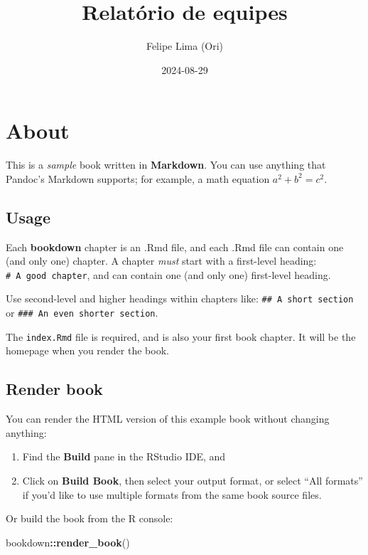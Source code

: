 \documentclass[
]{book}
\title{Relatório de equipes}
\author{Felipe Lima (Ori)}
\date{2024-08-29}
\newenvironment{Shaded}{\begin{snugshade}}{\end{snugshade}}
\newcommand{\FunctionTok}[1]{\textcolor[rgb]{0.13,0.29,0.53}{\textbf{#1}}}
\newcommand{\NormalTok}[1]{#1}
\newcommand{\SpecialCharTok}[1]{\textcolor[rgb]{0.81,0.36,0.00}{\textbf{#1}}}
\begin{document}
\maketitle

{
\setcounter{tocdepth}{1}
\tableofcontents
}
\chapter{About}\label{about}

This is a \emph{sample} book written in \textbf{Markdown}. You can use anything that Pandoc's Markdown supports; for example, a math equation \(a^2 + b^2 = c^2\).

\section{Usage}\label{usage}

Each \textbf{bookdown} chapter is an .Rmd file, and each .Rmd file can contain one (and only one) chapter. A chapter \emph{must} start with a first-level heading: \texttt{\#\ A\ good\ chapter}, and can contain one (and only one) first-level heading.

Use second-level and higher headings within chapters like: \texttt{\#\#\ A\ short\ section} or \texttt{\#\#\#\ An\ even\ shorter\ section}.

The \texttt{index.Rmd} file is required, and is also your first book chapter. It will be the homepage when you render the book.

\section{Render book}\label{render-book}

You can render the HTML version of this example book without changing anything:

\begin{enumerate}
\def\labelenumi{\arabic{enumi}.}
\item
  Find the \textbf{Build} pane in the RStudio IDE, and
\item
  Click on \textbf{Build Book}, then select your output format, or select ``All formats'' if you'd like to use multiple formats from the same book source files.
\end{enumerate}

Or build the book from the R console:

\begin{Shaded}
\begin{Highlighting}[]
\NormalTok{bookdown}\SpecialCharTok{::}\FunctionTok{render\_book}\NormalTok{()}
\end{Highlighting}
\end{Shaded}
\end{document}
